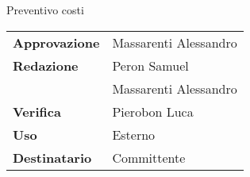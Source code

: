 \documentclass{article}
\renewcommand{\title}{Preventivo costi}
\begin{document}
\begin{center}

    
    
    \Huge \title
        
    \vspace{2cm}
    
    \normalsize
    \begin{center}
        \begin{tabularx}{7cm}{l | X}            
            \textbf{Approvazione} & Massarenti Alessandro\\
            \textbf{Redazione} & Peron Samuel\\
            &Massarenti Alessandro\\
            \textbf{Verifica} & Pierobon Luca\\
            \hline
            \textbf{Uso} & Esterno\\
            \textbf{Destinatario} & Committente\\
        \end{tabularx}
    \end{center}
        
\end{center}

\tableofcontents

\newpage


\end{document}
